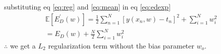 \documentclass[12pt]{article}
\begin{document}
substituting eq \eqref{eq:reg} and \eqref{eq:mean} in eq \eqref{eq:edexp}
\begin{align}
\mathbb{E}\left[E_D^{\prime}(w)\right] = \frac{1}{2} \sum_{n=1}^{N}\left[y(x_n,w) - t_n \right]^2 + \sum_{i=1}^{N} w_i^2\\
= E_D(w) + \frac{N}{2} \sum_{i=1}^{N} w_i^2
\end{align}
$\therefore$ we get a $L_2$ regularization term without the bias parameter $w_o$.
\end{document}
